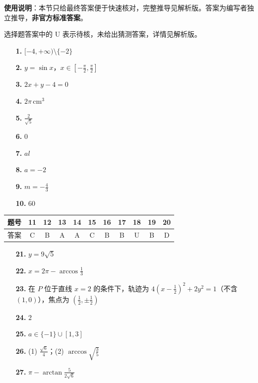 
\begin{gknotice}
\textbf{使用说明}：本节只给最终答案便于快速核对，完整推导见解析版。答案为编写者独立推导，\textbf{非官方标准答案}。
\end{gknotice}

\begin{gknotice}
选择题答案中的 U 表示待核，未给出猜测答案，详情见解析版。
\end{gknotice}

\begin{itemize}[leftmargin=2.6em]
  \item[\textbf{1.}] $[-4,+\infty)\setminus\{-2\}$
  \item[\textbf{2.}] $y=\sin x$，$x\in[-\frac\pi2,\frac\pi2]$
  \item[\textbf{3.}] $2x+y-4=0$
  \item[\textbf{4.}] $2\pi\,\mathrm{cm}^3$
  \item[\textbf{5.}] $\frac{2}{\sqrt5}$
  \item[\textbf{6.}] $0$
  \item[\textbf{7.}] $al$
  \item[\textbf{8.}] $a=-2$
  \item[\textbf{9.}] $m=-\frac43$
  \item[\textbf{10.}] $60$
\end{itemize}

\begin{center}\begin{tabular}{ccccccccccc}
\toprule
题号 & 11 & 12 & 13 & 14 & 15 & 16 & 17 & 18 & 19 & 20 \\
\midrule
答案 & C & B & A & A & C & B & B & U & B & D \\
\bottomrule
\end{tabular}\end{center}

\begin{itemize}[leftmargin=2.6em]
  \item[\textbf{21.}] $y=9\sqrt5$
  \item[\textbf{22.}] $x=2\pi-\arccos\frac13$
  \item[\textbf{23.}] 在 $P$ 位于直线 $x=2$ 的条件下，轨迹为 $4(x-\frac12)^2+2y^2=1$（不含 $(1,0)$），焦点为 $(\frac12,\pm\frac12)$
  \item[\textbf{24.}] $2$
  \item[\textbf{25.}] $a\in\{-1\}\cup[1,3]$
  \item[\textbf{26.}] (1) $\frac{\sqrt6}{4}$；(2) $\arccos\sqrt{\frac35}$
  \item[\textbf{27.}] $\pi-\arctan\frac{5}{2\sqrt6}$
\end{itemize}
